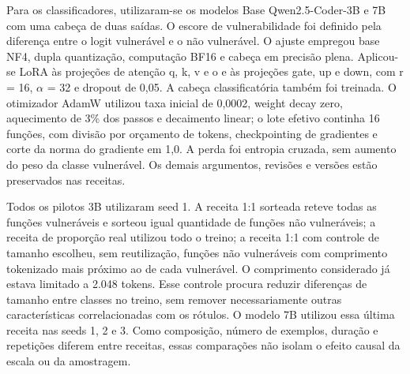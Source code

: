 \documentclass[12pt,a4paper]{article}
\begin{document}
Para os classificadores, utilizaram-se os modelos Base Qwen2.5-Coder-3B e 7B com uma cabeça de duas saídas. O escore de vulnerabilidade foi definido pela diferença entre o logit vulnerável e o não vulnerável. O ajuste empregou base NF4, dupla quantização, computação BF16 e cabeça em precisão plena. Aplicou-se LoRA às projeções de atenção q, k, v e o e às projeções gate, up e down, com r = 16, \(\alpha\) = 32 e dropout de 0,05. A cabeça classificatória também foi treinada. O otimizador AdamW utilizou taxa inicial de 0,0002, weight decay zero, aquecimento de 3\% dos passos e decaimento linear; o lote efetivo continha 16 funções, com divisão por orçamento de tokens, checkpointing de gradientes e corte da norma do gradiente em 1,0. A perda foi entropia cruzada, sem aumento do peso da classe vulnerável. Os demais argumentos, revisões e versões estão preservados nas receitas.

\begin{table}[htbp]
\centering
\caption{Configurações de ajuste. Tempo corresponde ao treino registrado; custo inclui o tempo total registrado da rodada, ao preço histórico de US\$ 0,50/h. As horas não representam orçamento igual entre receitas.}
\footnotesize\setlength{\tabcolsep}{3pt}
\end{table}

Todos os pilotos 3B utilizaram seed 1. A receita 1:1 sorteada reteve todas as funções vulneráveis e sorteou igual quantidade de funções não vulneráveis; a receita de proporção real utilizou todo o treino; a receita 1:1 com controle de tamanho escolheu, sem reutilização, funções não vulneráveis com comprimento tokenizado mais próximo ao de cada vulnerável. O comprimento considerado já estava limitado a 2.048 tokens. Esse controle procura reduzir diferenças de tamanho entre classes no treino, sem remover necessariamente outras características correlacionadas com os rótulos. O modelo 7B utilizou essa última receita nas seeds 1, 2 e 3. Como composição, número de exemplos, duração e repetições diferem entre receitas, essas comparações não isolam o efeito causal da escala ou da amostragem.
\end{document}
